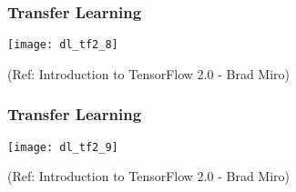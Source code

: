 

\begin{frame}[fragile] \frametitle{Transfer Learning}

\begin{center}
\texttt{[image: dl\_tf2\_8]}
\end{center}


\tiny{(Ref: Introduction to TensorFlow 2.0 - Brad Miro)}
\end{frame}

\begin{frame}[fragile] \frametitle{Transfer Learning}

\begin{center}
\texttt{[image: dl\_tf2\_9]}
\end{center}


\tiny{(Ref: Introduction to TensorFlow 2.0 - Brad Miro)}
\end{frame}

